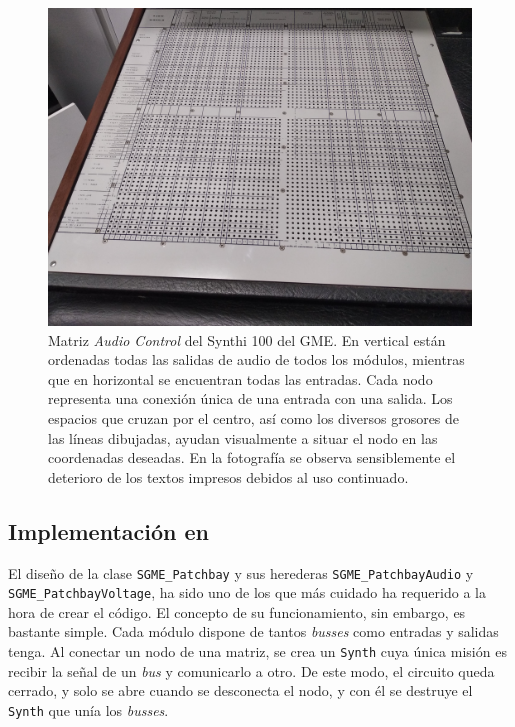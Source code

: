 \begin{figure}
	\centering
	\includegraphics[width=1\textwidth]{images/patchbay_audio_vista_gral}
	\caption[Matriz \textit{Audio Control} del Synthi 100 del GME]{Matriz \textit{Audio Control} del Synthi 100 del GME. En vertical están ordenadas todas las salidas de audio de todos los módulos, mientras que en horizontal se encuentran todas las entradas. Cada nodo representa una conexión única de una entrada con una salida. Los espacios que cruzan por el centro, así como los diversos grosores de las líneas dibujadas, ayudan visualmente a situar el nodo en las coordenadas deseadas. En la fotografía se observa sensiblemente el deterioro de los textos impresos debidos al uso continuado.}
	\label{fig:patchbay_audio_vista_gral}
\end{figure}

\subsection{Implementación en \appName}

El diseño de la clase \texttt{SGME\_Patchbay} y sus herederas \texttt{SGME\_PatchbayAudio} y \texttt{SGME\_PatchbayVoltage}, ha sido uno de los que más cuidado ha requerido a la hora de crear el código. El concepto de su funcionamiento, sin embargo, es bastante simple. Cada módulo dispone de tantos \textit{busses} como entradas y salidas tenga. Al conectar un nodo de una matriz, se crea un \texttt{Synth} cuya única misión es recibir la señal de un \textit{bus} y comunicarlo a otro. De este modo, el circuito queda cerrado, y solo se abre cuando se desconecta el nodo, y con él se destruye el \texttt{Synth} que unía los \textit{busses}.

